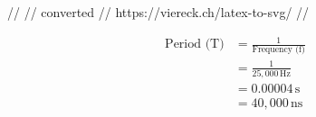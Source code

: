 //
// converted 
// https://viereck.ch/latex-to-svg/
//

\begin{align*}
\text{Period (T)} &= \frac{1}{\text{Frequency (f)}} \\
&= \frac{1}{25,000 \, \mathrm{Hz}} \\
&= 0.00004 \, \mathrm{s} \\
&= 40,000 \, \mathrm{ns}
\end{align*}